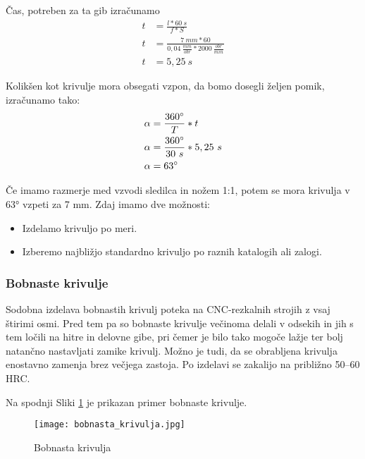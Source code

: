 Čas, potreben za ta gib izračunamo
\begin{equation}
	\label{cas_za_hod}
	\begin{split}
		t &= \frac{l*60\ s}{f*S} \\
		t &= \frac{7\ mm*60}{0,04\ \frac{mm}{obr}*2000\ \frac{obr}{min}} \\
		t &= 5,25\ s
	\end{split}
\end{equation}

Kolikšen kot krivulje mora obsegati vzpon, da bomo
dosegli željen pomik, izračunamo tako:
\begin{equation}
	\label{kot_krivulje}
	\begin{split}
		\alpha &= \frac{360\degree}{T} * t \\
		\alpha &= \frac{360\degree}{30\ s} * 5,25\ s \\
		\alpha &= 63\degree
	\end{split}
\end{equation}

Če imamo razmerje med vzvodi sledilca in nožem 1:1, potem se mora krivulja v 63° vzpeti za 7 mm.
Zdaj imamo dve možnosti:
\begin{itemize}
	\item Izdelamo krivuljo po meri.
	\item Izberemo najbližjo standardno krivuljo po raznih katalogih ali zalogi.
\end{itemize}

\subsubsection{Bobnaste krivulje}
Sodobna izdelava bobnastih krivulj poteka na CNC-rezkalnih strojih
z vsaj štirimi osmi. Pred tem pa so bobnaste krivulje večinoma delali v
odsekih in jih s tem ločili na hitre in delovne gibe, pri čemer je bilo tako
mogoče lažje ter bolj natančno nastavljati zamike krivulj.
Možno je tudi, da se obrabljena krivulja enostavno zamenja brez
večjega zastoja. Po izdelavi se zakalijo na približno 50--60 HRC.

Na spodnji Sliki \ref{bobnaste_krivulje} je prikazan primer
bobnaste krivulje.

\begin{figure}[H]
	\begin{center}
		\texttt{[image: bobnasta\_krivulja.jpg]}
		\caption{Bobnasta krivulja
			\cite{lasten}}
		\label{bobnaste_krivulje}
	\end{center}
\end{figure}

